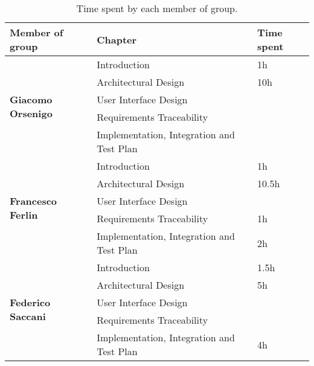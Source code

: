 \begin{table}[H]
    \centering
    \begin{tabular}{|l|l|l|}
        \hline
        \textbf{Member of group }                  & \textbf{Chapter}                          & \textbf{Time spent} \\\hline
        \multirow{5}{*}{\textbf{Giacomo Orsenigo}} & Introduction                              & 1h                  \\
                                                   & Architectural Design                      & 10h                 \\
                                                   & User Interface Design                     &                     \\
                                                   & Requirements Traceability                 &                     \\
                                                   & Implementation, Integration and Test Plan &                     \\\hline
        \multirow{5}{*}{\textbf{Francesco Ferlin}} & Introduction                              & 1h                  \\
                                                   & Architectural Design                      & 10.5h               \\
                                                   & User Interface Design                     &                     \\
                                                   & Requirements Traceability                 & 1h                  \\
                                                   & Implementation, Integration and Test Plan & 2h                  \\\hline
        \multirow{5}{*}{\textbf{Federico Saccani}} & Introduction                              & 1.5h                \\
                                                   & Architectural Design                      & 5h                  \\
                                                   & User Interface Design                     &                     \\
                                                   & Requirements Traceability                 &                     \\
                                                   & Implementation, Integration and Test Plan & 4h                  \\\hline
    \end{tabular}
    \caption{Time spent by each member of group.}
    \label{table:Time spent}
\end{table}
